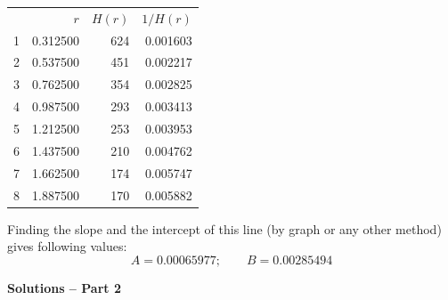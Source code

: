 \begin{description}
  \begin{center}
  \begin{tabular}{rrrr}
  & $r$ & $H(r)$ & $1/H(r)$\\
  1 & 0.312500 & 624 & 0.001603\\
  2 & 0.537500 & 451 & 0.002217\\
  3 & 0.762500 & 354 & 0.002825\\
  4 & 0.987500 & 293 & 0.003413\\
  5 & 1.212500 & 253 & 0.003953\\
  6 & 1.437500 & 210 & 0.004762\\
  7 & 1.662500 & 174 & 0.005747\\
  8 & 1.887500 & 170 & 0.005882
  \end{tabular}
  \end{center}

  Finding the slope and the intercept of this line (by graph or any
  other method) gives following values:
  \[ A = 0.00065977;\qquad B = 0.00285494 \]
\end{description}

\textbf{Solutions -- Part 2}


